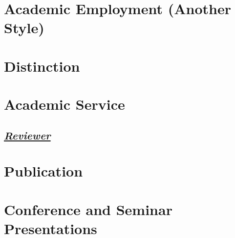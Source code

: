 \documentclass{article}
\newcommand{\cvsection}[1]{\section*{\bfseries#1}}
\newcommand{\cvsubsection}[1]{\subsection*{\itshape\uline{#1}}}
\begin{document}








\cvsection{Academic Employment (Another Style)}









\cvsection{Distinction}




\cvsection{Academic Service}

\cvsubsection{Reviewer}









\cvsection{Publication}




\cvsection{Conference and Seminar Presentations}
\end{document}
